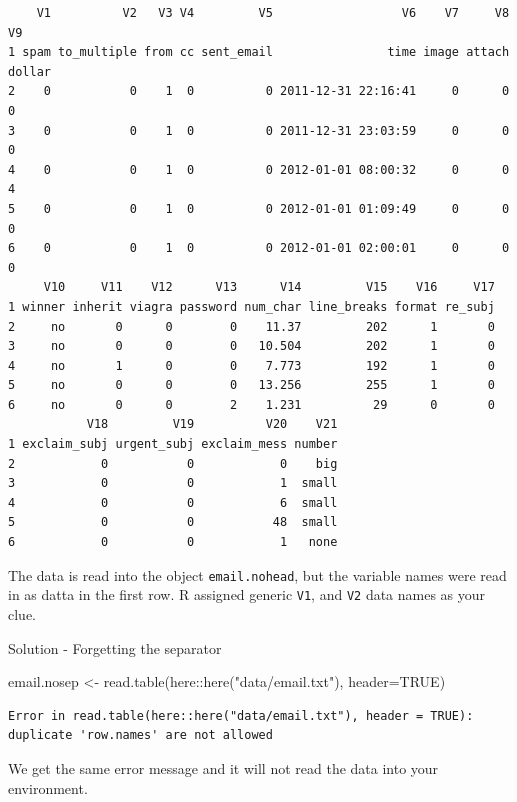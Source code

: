 \documentclass[
  letterpaper,
  DIV=11,
  numbers=noendperiod,
  oneside]{scrreprt}
\newenvironment{Shaded}{\begin{snugshade}}{\end{snugshade}}
\newcommand{\AttributeTok}[1]{\textcolor[rgb]{0.40,0.45,0.13}{#1}}
\newcommand{\ConstantTok}[1]{\textcolor[rgb]{0.56,0.35,0.01}{#1}}
\newcommand{\FunctionTok}[1]{\textcolor[rgb]{0.28,0.35,0.67}{#1}}
\newcommand{\NormalTok}[1]{\textcolor[rgb]{0.00,0.23,0.31}{#1}}
\newcommand{\OtherTok}[1]{\textcolor[rgb]{0.00,0.23,0.31}{#1}}
\newcommand{\SpecialCharTok}[1]{\textcolor[rgb]{0.37,0.37,0.37}{#1}}
\newcommand{\StringTok}[1]{\textcolor[rgb]{0.13,0.47,0.30}{#1}}
\begin{document}
\begin{tcolorbox}
\begin{verbatim}
    V1          V2   V3 V4         V5                  V6    V7     V8     V9
1 spam to_multiple from cc sent_email                time image attach dollar
2    0           0    1  0          0 2011-12-31 22:16:41     0      0      0
3    0           0    1  0          0 2011-12-31 23:03:59     0      0      0
4    0           0    1  0          0 2012-01-01 08:00:32     0      0      4
5    0           0    1  0          0 2012-01-01 01:09:49     0      0      0
6    0           0    1  0          0 2012-01-01 02:00:01     0      0      0
     V10     V11    V12      V13      V14         V15    V16     V17
1 winner inherit viagra password num_char line_breaks format re_subj
2     no       0      0        0    11.37         202      1       0
3     no       0      0        0   10.504         202      1       0
4     no       1      0        0    7.773         192      1       0
5     no       0      0        0   13.256         255      1       0
6     no       0      0        2    1.231          29      0       0
           V18         V19          V20    V21
1 exclaim_subj urgent_subj exclaim_mess number
2            0           0            0    big
3            0           0            1  small
4            0           0            6  small
5            0           0           48  small
6            0           0            1   none
\end{verbatim}

The data is read into the object \texttt{email.nohead}, but the variable
names were read in as datta in the first row. R assigned generic
\texttt{V1}, and \texttt{V2} data names as your clue.

Solution - Forgetting the separator

\begin{Shaded}
\begin{Highlighting}[]
\NormalTok{email.nosep }\OtherTok{\textless{}{-}} \FunctionTok{read.table}\NormalTok{(here}\SpecialCharTok{::}\FunctionTok{here}\NormalTok{(}\StringTok{"data/email.txt"}\NormalTok{), }\AttributeTok{header=}\ConstantTok{TRUE}\NormalTok{)}
\end{Highlighting}
\end{Shaded}

\begin{verbatim}
Error in read.table(here::here("data/email.txt"), header = TRUE): duplicate 'row.names' are not allowed
\end{verbatim}

We get the same error message and it will not read the data into your
environment.

\end{tcolorbox}
\end{document}
